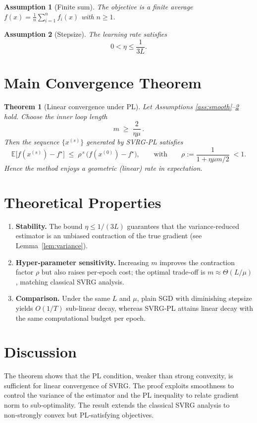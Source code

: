 \documentclass{article}
\newtheorem{assumption}{Assumption}
\newtheorem{theorem}{Theorem}
\newcommand{\E}{\mathbb{E}}
\begin{document}
\begin{assumption}[Finite sum]\label{ass:finite}
The objective is a finite average $f(x)=\frac1n\sum_{i=1}^n f_i(x)$ with $n\ge 1$.
\end{assumption}

\begin{assumption}[Stepsize]\label{ass:stepsize}
The learning rate satisfies
\[
0<\eta\le \frac{1}{3L}.
\]
\end{assumption}

\section*{Main Convergence Theorem}
\begin{theorem}[Linear convergence under PL]\label{thm:linear}
Let Assumptions \ref{ass:smooth}–\ref{ass:stepsize} hold.  
Choose the inner loop length
\[
m \;\ge\; \frac{2}{\eta\mu}\, .
\]
Then the sequence $\{x^{(s)}\}$ generated by SVRG‑PL satisfies
\[
\E\!\bigl[f(x^{(s)})-f^\star\bigr]\;\le\;\rho^{\,s}\,\bigl(f(x^{(0)})-f^\star\bigr),
\qquad\text{with}\qquad 
\rho:=\frac{1}{1+\eta\mu m/2}\;<1 .
\]
Hence the method enjoys a geometric (linear) rate in expectation.
\end{theorem}

\section*{Theoretical Properties}
\begin{enumerate}[label=\arabic*.]
\item \textbf{Stability.} The bound $\eta\le 1/(3L)$ guarantees that the variance‑reduced estimator is an unbiased contraction of the true gradient (see Lemma~\ref{lem:variance}).
\item \textbf{Hyper‑parameter sensitivity.} Increasing $m$ improves the contraction factor $\rho$ but also raises per‑epoch cost; the optimal trade‑off is $m\approx\Theta(L/\mu)$, matching classical SVRG analysis.
\item \textbf{Comparison.} Under the same $L$ and $\mu$, plain SGD with diminishing stepsize yields $O(1/T)$ sub‑linear decay, whereas SVRG‑PL attains linear decay with the same computational budget per epoch.
\end{enumerate}

\section*{Discussion}
The theorem shows that the PL condition, weaker than strong convexity, is sufficient for linear convergence of SVRG. The proof exploits smoothness to control the variance of the estimator and the PL inequality to relate gradient norm to sub‑optimality. The result extends the classical SVRG analysis to non‑strongly convex but PL‑satisfying objectives.
\end{document}
